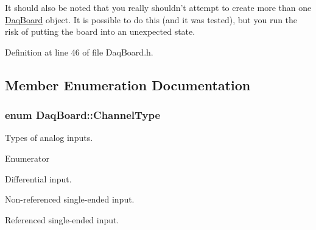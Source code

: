 It should also be noted that you really shouldn't attempt to create more than one \hyperlink{class_daq_board}{Daq\-Board} object. It is possible to do this (and it was tested), but you run the risk of putting the board into an unexpected state. 

Definition at line 46 of file Daq\-Board.\-h.



\subsection{Member Enumeration Documentation}
\hypertarget{class_daq_board_adc04f1440c6e392e2c5da2340b9da420}{
\subsubsection[{Channel\-Type}]{\setlength{\rightskip}{0pt plus 5cm}enum {\bf Daq\-Board\-::\-Channel\-Type}}}\label{class_daq_board_adc04f1440c6e392e2c5da2340b9da420}


Types of analog inputs. 

\begin{Desc}
\item[Enumerator]\par
\begin{description}
\item[{\em 
\hypertarget{class_daq_board_adc04f1440c6e392e2c5da2340b9da420a7143906b2b10a38ef0ffb592fe59f644}{k\-Chan\-Type\-Differential}\label{class_daq_board_adc04f1440c6e392e2c5da2340b9da420a7143906b2b10a38ef0ffb592fe59f644}
}]Differential input. \item[{\em 
\hypertarget{class_daq_board_adc04f1440c6e392e2c5da2340b9da420a9575eb0c9b9d0c904bc55203db2ad2f2}{k\-Chan\-Type\-N\-R\-S\-E}\label{class_daq_board_adc04f1440c6e392e2c5da2340b9da420a9575eb0c9b9d0c904bc55203db2ad2f2}
}]Non-\/referenced single-\/ended input. \item[{\em 
\hypertarget{class_daq_board_adc04f1440c6e392e2c5da2340b9da420adf2d9ac3fe1e4866ba5166052d751e16}{k\-Chan\-Type\-R\-S\-E}\label{class_daq_board_adc04f1440c6e392e2c5da2340b9da420adf2d9ac3fe1e4866ba5166052d751e16}
}]Referenced single-\/ended input. \end{description}
\end{Desc}


